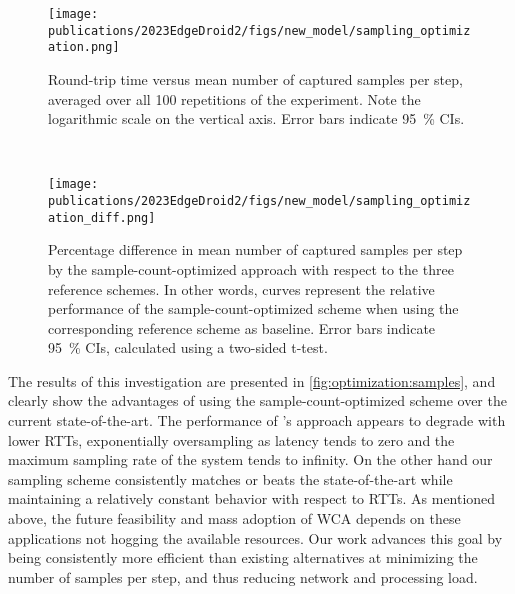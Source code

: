 \begin{figure*}
    \centering
    \begin{subfigure}[t]{\textwidth}
        \centering
        \texttt{[image: publications/2023EdgeDroid2/figs/new\_model/sampling\_optimization.png]}
        \caption{%
            Round-trip time versus mean number of captured samples per step, averaged over all \num{100} repetitions of the experiment.
            Note the logarithmic scale on the vertical axis.
            Error bars indicate \SI{95}{\percent} \glspl{CI}.
        }
    \end{subfigure}\\
    \medskip
    \begin{subfigure}[t]{\textwidth}
        \centering
        \texttt{[image: publications/2023EdgeDroid2/figs/new\_model/sampling\_optimization\_diff.png]}
        \caption{%
            Percentage difference in mean number of captured samples per step by the sample-count-optimized approach with respect to the three reference schemes.
            In other words, curves represent the relative performance of the sample-count-optimized scheme when using the corresponding reference scheme as baseline.
            Error bars indicate \SI{95}{\percent} \glspl{CI}, calculated using a two-sided t-test.
        }
    \end{subfigure}
    \caption{%
        Summary of results for experiment comparing the sample-count-optimized aperiodic sampling scheme to the reference schemes and \textcite{wang2019towards}'s \gls{CDF}-based approach.
    }\label{fig:optimization:samples}
\end{figure*}

The results of this investigation are presented in \cref{fig:optimization:samples}, and clearly show the advantages of using the sample-count-optimized scheme over the current state-of-the-art.
The performance of \textcite{wang2019towards}'s approach appears to degrade with lower \glspl{RTT}, exponentially oversampling as latency tends to zero and the maximum sampling rate of the system tends to infinity.
On the other hand our sampling scheme consistently matches or beats the state-of-the-art while maintaining a relatively constant behavior with respect to \glspl{RTT}.
As mentioned above, the future feasibility and mass adoption of \gls{WCA} depends on these applications not hogging the available resources.
Our work advances this goal by being consistently more efficient than existing alternatives at minimizing the number of samples per step, and thus reducing network and processing load.

